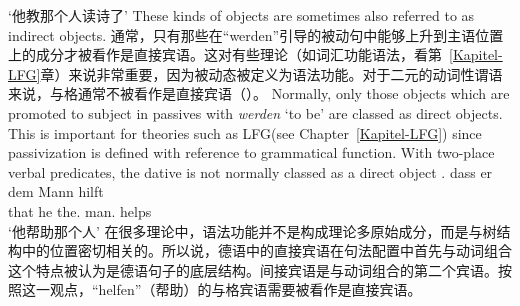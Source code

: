 \glt `他教那个人读诗了'
\zl
These kinds of objects are sometimes also referred to as indirect objects.
通常，只有那些在“werden”引导的被动句中能够上升到主语位置上的成分才被看作是直接宾语。这对有些理论（如词汇功能语法，看第~\ref{Kapitel-LFG}章）来说非常重要，因为被动态被定义为语法功能。对于二元的动词性谓语来说，与格通常不被看作是直接宾语（\citep{Cook2006a-u}）。
Normally, only those objects which are promoted to subject in passives with \emph{werden} `to be' are classed as direct objects. This is important for theories such as LFG\indexlfg (see Chapter~\ref{Kapitel-LFG}) since
passivization is defined with reference to grammatical function. With two-place verbal predicates, the dative 
is not normally classed as a direct object \citep{Cook2006a-u}. 
\ea
\gll dass er dem Mann hilft\\
     that he the.\dat{} man.\dat{} helps\\
\glt `他帮助那个人'
\z
在很多理论中，语法功能并不是构成理论多原始成分，而是与树结构中的位置密切相关的。所以说，德语中的直接宾语在句法配置中首先与动词组合这个特点被认为是德语句子的底层结构。间接宾语是与动词组合的第二个宾语。按照这一观点，“helfen”（帮助）的与格宾语需要被看作是直接宾语。

